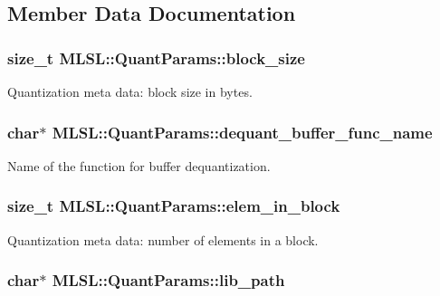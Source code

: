 \subsection{Member Data Documentation}
\hypertarget{structMLSL_1_1QuantParams_a9a384f669eae7ed99707f5a56c0cf9f3}{
\subsubsection[{block\-\_\-size}]{\setlength{\rightskip}{0pt plus 5cm}size\-\_\-t M\-L\-S\-L\-::\-Quant\-Params\-::block\-\_\-size}}\label{structMLSL_1_1QuantParams_a9a384f669eae7ed99707f5a56c0cf9f3}
Quantization meta data\-: block size in bytes. \hypertarget{structMLSL_1_1QuantParams_ac8f95f6abe7e8f117e85a90265cc420f}{
\subsubsection[{dequant\-\_\-buffer\-\_\-func\-\_\-name}]{\setlength{\rightskip}{0pt plus 5cm}char$\ast$ M\-L\-S\-L\-::\-Quant\-Params\-::dequant\-\_\-buffer\-\_\-func\-\_\-name}}\label{structMLSL_1_1QuantParams_ac8f95f6abe7e8f117e85a90265cc420f}
Name of the function for buffer dequantization. \hypertarget{structMLSL_1_1QuantParams_ad0e8588ca701c062f8a96cbf235c5d18}{
\subsubsection[{elem\-\_\-in\-\_\-block}]{\setlength{\rightskip}{0pt plus 5cm}size\-\_\-t M\-L\-S\-L\-::\-Quant\-Params\-::elem\-\_\-in\-\_\-block}}\label{structMLSL_1_1QuantParams_ad0e8588ca701c062f8a96cbf235c5d18}
Quantization meta data\-: number of elements in a block. \hypertarget{structMLSL_1_1QuantParams_a124d9ee5323d9dccdbabb031d5464c3a}{
\subsubsection[{lib\-\_\-path}]{\setlength{\rightskip}{0pt plus 5cm}char$\ast$ M\-L\-S\-L\-::\-Quant\-Params\-::lib\-\_\-path}}\label{structMLSL_1_1QuantParams_a124d9ee5323d9dccdbabb031d5464c3a}
